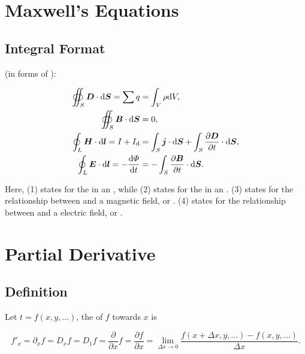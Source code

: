 \documentclass{article}
\title{\Title}
\author{\Author}
\date{\today}
\begin{document}
	\maketitle

	\section{Maxwell's Equations}

		\subsection{Integral Format}

			 (in forms of ):

			\begin{align}
				\oiint_{S} \boldsymbol{D} \cdot \mathrm{d} \boldsymbol{S} = \sum q &= \int_V \rho \mathrm{d} V,\\
				\oiint_{S} \boldsymbol{B} \cdot \mathrm{d} \boldsymbol{S} &= 0,\\
				\oint_{L} \boldsymbol{H} \cdot \mathrm{d} \boldsymbol{l} = I + I_{\mathrm{d}} &= \int_{S} \boldsymbol{j} \cdot \mathrm{d} \boldsymbol{S} + \int_{S} \frac{\partial \boldsymbol{D}}{\partial t} \cdot \mathrm{d} \boldsymbol{S},\\
				\oint_{L} \boldsymbol{E} \cdot \mathrm{d} \boldsymbol{l} = - \frac{\mathrm{d} \varPhi}{\mathrm{d} t} &= - \int_{S} \frac{\partial \boldsymbol{B}}{\partial t} \cdot \mathrm{d} \boldsymbol{S}.
			\end{align}

			Here, (1) states for the  in an , while (2) states for the  in an . (3) states for the relationship between  and a magnetic field, or . (4) states for the relationship between  and a electric field, or .

	\section{Partial Derivative}

		\subsection{Definition}

			Let \(t=f(x, y, \ldots)\), the  of \(f\) towards \(x\) is

			\[
				f'_{x} = \partial_x f = D_x f = D_1 f = \frac{\partial}{\partial x} f = \frac{\partial f}{\partial x} = \lim_{\Delta x \rightarrow 0} \frac{f(x + \Delta x, y, \ldots) - f(x, y, \ldots)}{\Delta x}.
			\]
\end{document}
